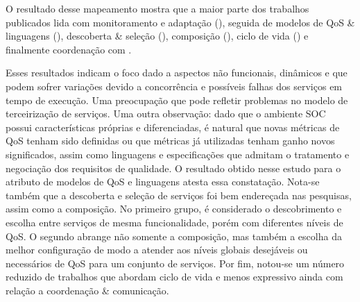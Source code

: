 O resultado desse mapeamento mostra que a maior parte dos trabalhos publicados lida com monitoramento e adapta\c{c}\~{a}o (\MonitoramentoAdaptacao), seguida de modelos de QoS \& linguagens (\ModelosdeQoSeLinguagens), descoberta \& sele\c{c}\~{a}o (\DescobrimentoSelecao),  composi\c{c}\~{a}o (\Composicao), ciclo de vida (\Ciclodevida) e finalmente coordenação com \CoodenacaoComunicacao.

Esses resultados indicam o foco dado a aspectos não funcionais, dinâmicos e que podem sofrer variações devido a concorrência e poss\'{i}veis falhas dos servi\c{c}os em tempo de execu\c{c}\~{a}o. Uma preocupa\c{c}\~{a}o que pode refletir problemas no modelo de terceirização de serviços. Uma outra observa\c{c}\~{a}o: dado que o ambiente SOC possui características próprias e diferenciadas, é natural que novas métricas de QoS tenham sido definidas ou que métricas já utilizadas tenham ganho novos significados, assim como linguagens e especificações que admitam o tratamento e negociação dos requisitos de qualidade. O resultado obtido nesse estudo para o atributo de modelos de QoS e linguagens atesta essa constatação. Nota-se também que a descoberta e seleção de serviços foi bem endereçada nas pesquisas, assim como a composição. No primeiro grupo, é considerado o descobrimento e escolha entre serviços de mesma funcionalidade, porém com diferentes níveis de QoS. O segundo abrange não somente a composição, mas também a escolha da melhor configuração de modo a atender aos níveis globais desejáveis ou necessários de QoS para um conjunto de serviços. Por fim, notou-se um número reduzido de trabalhos que abordam ciclo de vida e menos expressivo ainda com rela\c{c}\~{a}o a coordenação \& comunicação. 